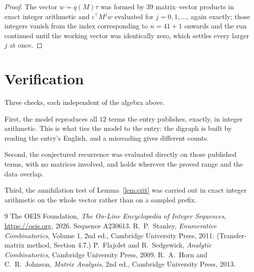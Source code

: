 \documentclass[11pt,a4paper]{article}
\theoremstyle{plain}
\theoremstyle{definition}
\begin{document}
\begin{proof}
The vector $w=q(M)\tau$ was formed by $39$ matrix--vector products in exact integer
arithmetic and $\iota^{\!\top}M^{j}w$ evaluated for $j=0,1,\dots$, again exactly; those
integers vanish from the index corresponding to $n=41+1$ onwards and the run continued
until the working vector was identically zero, which settles every larger $j$ at once.
\end{proof}

\section{Verification}

Three checks, each independent of the algebra above.

First, the model reproduces all $12$ terms the entry publishes, exactly, in integer
arithmetic. This is what ties the model to the entry: the digraph is built by reading the
entry's English, and a misreading gives different counts.

Second, the conjectured recurrence was evaluated directly on those published terms, with no
matrices involved, and holds wherever the proved range and the data overlap.

Third, the annihilation test of Lemma~\ref{lem:crit} was carried out in exact integer
arithmetic on the whole vector rather than on a sampled prefix.

\begin{thebibliography}{9}
 The OEIS Foundation, \emph{The On-Line Encyclopedia of Integer
Sequences}, \url{https://oeis.org}, 2026. Sequence A230613.
 R.~P.~Stanley, \emph{Enumerative Combinatorics}, Volume 1, 2nd ed.,
Cambridge University Press, 2011. (Transfer-matrix method, Section 4.7.)
 P.~Flajolet and R.~Sedgewick, \emph{Analytic Combinatorics}, Cambridge
University Press, 2009.
 R.~A.~Horn and C.~R.~Johnson, \emph{Matrix Analysis}, 2nd ed., Cambridge
University Press, 2013.
\end{thebibliography}
\end{document}
